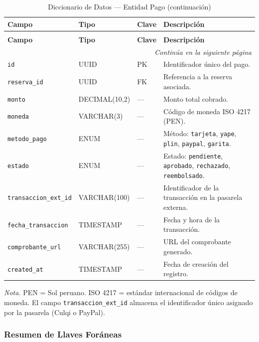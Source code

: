 \begin{longtable}{p{3.5cm} p{2.5cm} p{1.5cm} p{6.5cm}}
\caption{Diccionario de Datos --- Entidad Pago} \\
\toprule
\textbf{Campo} & \textbf{Tipo} & \textbf{Clave} & \textbf{Descripción} \\
\midrule
\endfirsthead

\caption[]{Diccionario de Datos --- Entidad Pago (continuación)} \\
\toprule
\textbf{Campo} & \textbf{Tipo} & \textbf{Clave} & \textbf{Descripción} \\
\midrule
\endhead

\midrule
\multicolumn{4}{r}{\footnotesize\textit{Continúa en la siguiente página}} \\
\endfoot

\bottomrule
\endlastfoot

\texttt{id} & UUID & PK & Identificador único del pago. \\
\texttt{reserva\_id} & UUID & FK & Referencia a la reserva asociada. \\
\texttt{monto} & DECIMAL(10,2) & --- & Monto total cobrado. \\
\texttt{moneda} & VARCHAR(3) & --- & Código de moneda ISO 4217 (PEN). \\
\texttt{metodo\_pago} & ENUM & --- & Método: \texttt{tarjeta}, \texttt{yape}, \texttt{plin}, \texttt{paypal}, \texttt{garita}. \\
\texttt{estado} & ENUM & --- & Estado: \texttt{pendiente}, \texttt{aprobado}, \texttt{rechazado}, \texttt{reembolsado}. \\
\texttt{transaccion\_ext\_id} & VARCHAR(100) & --- & Identificador de la transacción en la pasarela externa. \\
\texttt{fecha\_transaccion} & TIMESTAMP & --- & Fecha y hora de la transacción. \\
\texttt{comprobante\_url} & VARCHAR(255) & --- & URL del comprobante generado. \\
\texttt{created\_at} & TIMESTAMP & --- & Fecha de creación del registro. \\
\end{longtable}

\textit{Nota.} PEN = Sol peruano. ISO 4217 = estándar internacional de códigos de moneda. El campo \texttt{transaccion\_ext\_id} almacena el identificador único asignado por la pasarela (Culqi o PayPal).

\newpage\subsubsection{Resumen de Llaves Foráneas}

